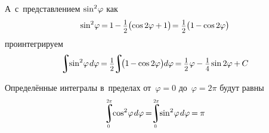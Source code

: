 \documentclass[14pt]{extarticle}
\DeclareMathOperator*{\integral}{\scalerel*{\rotatebox{12}{$\!\textstyle\int\!$}}{\int}} %
\newcommand\cosine{\operatorname{cos}}
\newcommand\sine{\operatorname{sin}}
\begin{document}
А~с~представлением ${\sine^{2} \hspace{-.33ex} \varphi}$ как
\[
\sine^{2} \hspace{-.33ex} \varphi \hspace{-.2ex}
= \hspace{-.2ex} 1 \hspace{-.2ex} - \hspace{-.1ex} \scalebox{.88}{$ \displaystyle\frac{\raisebox{-.2em}{$1$}}{2} $} \bigl( \cosine 2\varphi \hspace{-.1ex} + \hspace{-.1ex} 1 \bigr) \hspace{-.4ex}
= \scalebox{.88}{$ \displaystyle\frac{\raisebox{-.2em}{$1$}}{2} $} \bigl( 1 \hspace{-.2ex} - \hspace{-.1ex} \cosine 2\varphi \bigr)
\]
проинтегрируем
\[
\integral \hspace{-0.7ex} \sine^{2} \hspace{-.33ex} \varphi \hspace{.2ex} d\varphi \hspace{-.2ex}
= \hspace{-.1ex} \scalebox{.88}{$ \displaystyle\frac{\raisebox{-.2em}{$1$}}{2} $} \hspace{-.5ex}
\integral \hspace{-0.55ex} \bigl( 1 \hspace{-.2ex} - \hspace{-.1ex} \cosine 2\varphi \bigr) \hspace{-.1ex} d\varphi \hspace{-.2ex}
= \hspace{-.1ex} \scalebox{.88}{$ \displaystyle\frac{\raisebox{-.2em}{$1$}}{2} $} \hspace{.15ex} \varphi \hspace{-.1ex}
- \scalebox{.88}{$ \displaystyle\frac{\raisebox{-.2em}{$1$}}{4} $} \hspace{-.1ex} \sine 2\varphi \hspace{-.1ex}
+ \hspace{-.1ex} C
\]

Определённые интегралы в~пределах от~${\varphi \!=\! 0}$ до~${\varphi \!=\! 2\pi}$ будут равны
\nopagebreak\vspace{-.2em}\[
\integral_{\mathclap{\hspace{-.4ex} \scalebox{.6}{$ 0 $}}}^{\mathclap{\scalebox{.6}{$ 2\pi $}}} \hspace{-.7ex} \cosine^{2} \hspace{-.33ex} \varphi \hspace{.2ex} d\varphi \hspace{-.2ex}
= \hspace{-.7ex}
\integral_{\mathclap{\hspace{-.4ex} \scalebox{.6}{$ 0 $}}}^{\mathclap{\scalebox{.6}{$ 2\pi $}}} \hspace{-.7ex} \sine^{2} \hspace{-.33ex} \varphi \hspace{.2ex} d\varphi \hspace{-.2ex}
= \hspace{-.1ex} \pi
\]
\end{document}
